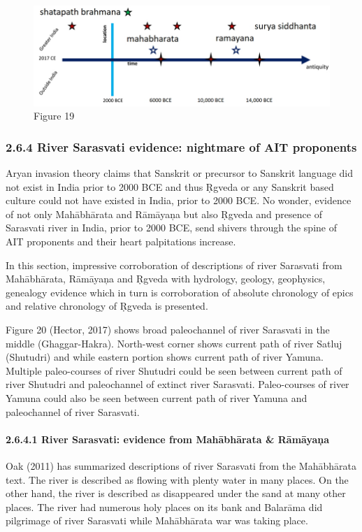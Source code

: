 \begin{figure}
\includegraphics{"images/8-19.jpg"}
\caption{Figure 19}
\end{figure}


\subsubsection{2.6.4 River Sarasvati evidence: nightmare of AIT proponents}

Aryan invasion theory claims that Sanskrit or precursor to Sanskrit language did not exist in India prior to 2000 BCE and thus Ṛgveda or any Sanskrit based culture could not have existed in India, prior to 2000 BCE. No wonder, evidence of not only Mahābhārata and Rāmāyaņa but also Ṛgveda and presence of Sarasvati river in India, prior to 2000 BCE, send shivers through the spine of AIT proponents and their heart palpitations increase.

In this section, impressive corroboration of descriptions of river Sarasvati from Mahābhārata, Rāmāyaņa and Ṛgveda with hydrology, geology, geophysics, genealogy evidence which in turn is corroboration of absolute chronology of epics and relative chronology of Ṛgveda is presented.

Figure 20 (Hector, 2017) shows broad paleochannel of river Sarasvati in the middle (Ghaggar-Hakra). North-west corner shows current path of river Satluj (Shutudri) and while eastern portion shows current path of river Yamuna. Multiple paleo-courses of river Shutudri could be seen between current path of river Shutudri and paleochannel of extinct river Sarasvati. Paleo-courses of river Yamuna could also be seen between current path of river Yamuna and paleochannel of river Sarasvati.

\paragraph{2.6.4.1 River Sarasvati: evidence from Mahābhārata \& Rāmāyaņa}

Oak (2011) has summarized descriptions of river Sarasvati from the Mahābhārata text. The river is described as flowing with plenty water in many places. On the other hand, the river is described as disappeared under the sand at many other places. The river had numerous holy places on its bank and Balarāma did pilgrimage of river Sarasvati while Mahābhārata war was taking place.

